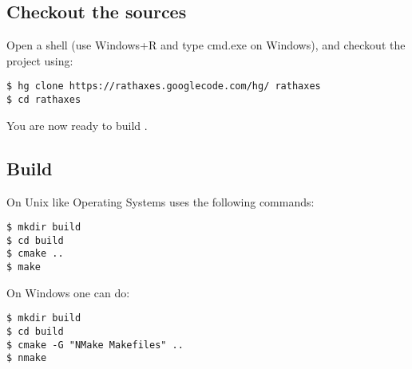 \documentclass[american]{rtxarticle}
\begin{document}
\subsection{Checkout the sources}

Open a shell (use Windows+R and type cmd.exe on Windows), and checkout the
project using:

\begin{verbatim}
$ hg clone https://rathaxes.googlecode.com/hg/ rathaxes
$ cd rathaxes
\end{verbatim}

You are now ready to build \rtx.

\subsection{Build \rtx}

On Unix like Operating Systems uses the following commands:

\begin{verbatim}
$ mkdir build
$ cd build
$ cmake ..
$ make
\end{verbatim}

On Windows one can do:

\begin{verbatim}
$ mkdir build
$ cd build
$ cmake -G "NMake Makefiles" ..
$ nmake
\end{verbatim}
\end{document}
